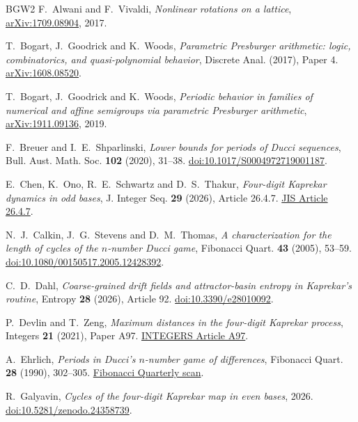 \documentclass[11pt,reqno]{amsart}
\theoremstyle{definition}
\begin{document}
\begingroup\raggedright\begin{thebibliography}{BGW2}
F.~Alwani and F.~Vivaldi, \emph{Nonlinear rotations on a lattice},
\href{https://arxiv.org/abs/1709.08904}{arXiv:1709.08904}, 2017.

T.~Bogart, J.~Goodrick and K.~Woods, \emph{Parametric Presburger arithmetic:
logic, combinatorics, and quasi-polynomial behavior},
Discrete Anal. (2017), Paper 4.
\href{https://arxiv.org/abs/1608.08520}{arXiv:1608.08520}.

T.~Bogart, J.~Goodrick and K.~Woods,
\emph{Periodic behavior in families of numerical and affine semigroups via
parametric Presburger arithmetic},
\href{https://arxiv.org/abs/1911.09136}{arXiv:1911.09136}, 2019.

F.~Breuer and I.~E.~Shparlinski, \emph{Lower bounds for periods of Ducci
sequences}, Bull. Aust. Math. Soc. \textbf{102} (2020), 31--38.
\href{https://doi.org/10.1017/S0004972719001187}{doi:10.1017/S0004972719001187}.

E.~Chen, K.~Ono, R.~E.~Schwartz and D.~S.~Thakur,
\emph{Four-digit Kaprekar dynamics in odd bases},
J. Integer Seq. \textbf{29} (2026), Article 26.4.7.
\href{https://cs.uwaterloo.ca/journals/JIS/VOL29/Ono/ono3.pdf}{JIS Article 26.4.7}.

N.~J.~Calkin, J.~G.~Stevens and D.~M.~Thomas,
\emph{A characterization for the length of cycles of the \(n\)-number
Ducci game}, Fibonacci Quart. \textbf{43} (2005), 53--59.
\href{https://doi.org/10.1080/00150517.2005.12428392}{doi:10.1080/00150517.2005.12428392}.

C.~D.~Dahl, \emph{Coarse-grained drift fields and attractor-basin entropy
in Kaprekar's routine}, Entropy \textbf{28} (2026), Article 92.
\href{https://doi.org/10.3390/e28010092}{doi:10.3390/e28010092}.

P.~Devlin and T.~Zeng, \emph{Maximum distances in the four-digit
Kaprekar process}, Integers \textbf{21} (2021), Paper A97.
\href{https://math.colgate.edu/~integers/v97/v97.pdf}{INTEGERS Article A97}.

A.~Ehrlich, \emph{Periods in Ducci's \(n\)-number game of differences},
Fibonacci Quart. \textbf{28} (1990), 302--305.
\href{https://www.fq.math.ca/Scanned/28-4/ehrlich.pdf}{Fibonacci Quarterly scan}.

R.~Galyavin, \emph{Cycles of the four-digit Kaprekar map in even bases}, 2026.
\href{https://doi.org/10.5281/zenodo.24358739}{doi:10.5281/zenodo.24358739}.


\end{thebibliography}
\end{document}
